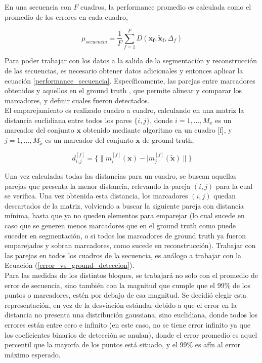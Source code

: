 En una secuencia con $F$ cuadros, la performance promedio es calculada como el promedio de los errores en cada cuadro,

\begin{equation} \label{performance_secuencia}
\mu_{secuencia} = \frac{1}{F}\sum_{f=1}^{F} D(\boldsymbol{x_{f}},\boldsymbol{\tilde{x}_{f}},\Delta_{f})
\end{equation}

Para poder trabajar con los datos a la salida de la segmentación y reconstrucción de las secuencias, es necesario obtener datos adicionales y entonces aplicar la ecuación \eqref{performance_secuencia}. Específicamente, las parejas entre marcadores obtenidos y aquellos en el ground truth , que permite alinear y comparar los marcadores, y definir cuales fueron detectados.
\\ 

El emparejamiento es realizado cuadro a cuadro, calculando en una matriz la distancia euclidiana entre todos los pares $\{i,j\}$, donde $i=1,\ldots,M_{x}$ es un marcador del conjunto $\boldsymbol{x}$ obtenido mediante algoritmo en un cuadro [f], y $j=1,\ldots,M_{\tilde{x}}$ es un marcador del conjunto $\boldsymbol{\tilde{x}}$ de ground truth,

\begin{equation} \label{distancia_algoritmo_ground}
d_{i,j}^{[f]} = \{\|m_{i}^{[f]}(\boldsymbol{x})-|m_{j}^{[f]}(\boldsymbol{\tilde{x}})\|\}
\end{equation}

Una vez calculadas todas las distancias para un cuadro, se buscan aquellas parejas que presenta la menor distancia, relevando la pareja $(i,j)$  para la cual se verifica. Una vez obtenida esta distancia, los marcadores $(i,j)$ quedan descartados de la matriz, volviendo a buscar la siguiente pareja con distancia mínima, hasta que ya no queden elementos para emparejar (lo cual sucede en caso que se generen menos marcadores que en el ground truth como puede suceder en segmentación, o si todos los marcadores de ground truth ya fueron emparejados y sobran marcadores, como sucede en reconstrucción). Trabajar con las parejas en todos los cuadros de la secuencia, es análogo a trabajar con la Ecuación (\ref{error_vs_ground_deteccion}).
\\ 

Para las medidas de los distintos bloques, se trabajará no solo con el promedio de error de secuencia, sino también con la magnitud que cumple que el 99\% de los puntos o marcadores, estén por debajo de esa magnitud. Se decidió elegir esta representación, en vez de la desviación estándar debido a que el error en la distancia no presenta una distribución gaussiana, sino euclidiana, donde todos los errores están entre cero e infinito (en este caso, no se tiene error infinito ya que los coeficientes binarios de detección se anulan), donde el error promedio es aquel percentil que la mayoría de los puntos está situado, y el 99\% es afín al error máximo esperado.

